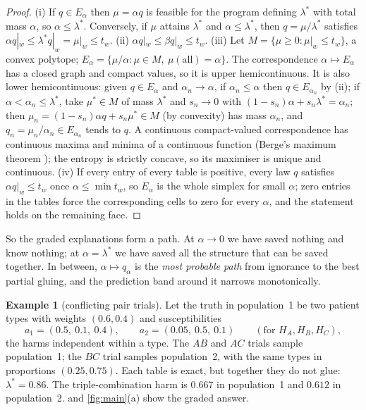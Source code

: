 \documentclass[11pt]{article}
\theoremstyle{definition}\newtheorem{definition}[theorem]{Definition}\newtheorem{remark}[theorem]{Remark}\newtheorem{example}[theorem]{Example}
\begin{document}
\begin{proof}
(i) If $q\in E_\alpha$ then $\mu=\alpha q$ is feasible for the program defining $\lambda^*$ with total mass $\alpha$, so $\alpha\le
\lambda^*$. Conversely, if $\mu$ attains $\lambda^*$ and $\alpha\le\lambda^*$, then $q=\mu/\lambda^*$ satisfies $\alpha q|_w\le
\lambda^* q|_w=\mu|_w\le t_w$. (ii) $\alpha q|_w\le\beta q|_w\le t_w$.
(iii) Let $M=\{\mu\ge0:\mu|_w\le t_w\}$, a convex polytope; $E_\alpha=\{\mu/\alpha:\mu\in M,\ \mu(\text{all})=\alpha\}$. The correspondence $\alpha\mapsto E_\alpha$ has a closed graph and compact values, so it is upper hemicontinuous. It is also lower hemicontinuous: given $q\in E_\alpha$ and $\alpha_n\to\alpha$, if $\alpha_n\le\alpha$ then $q\in E_{\alpha_n}$ by (ii); if $\alpha<\alpha_n\le\lambda^*$, take $\mu^*\in M$ of mass $\lambda^*$ and $s_n\to0$ with $(1-s_n)\alpha+s_n\lambda^*=\alpha_n$; then $\mu_n=(1-s_n)\alpha q+s_n\mu^*\in M$ (by convexity) has mass $\alpha_n$, and $q_n=\mu_n/\alpha_n\in E_{\alpha_n}$ tends to $q$. A continuous compact-valued correspondence has continuous maxima and minima of a
continuous function (Berge's maximum theorem \cite{Berge1963}); the entropy is strictly concave, so its maximiser is unique and
continuous. (iv) If every entry of every table is positive, every law $q$ satisfies $\alpha q|_w\le t_w$ once $\alpha\le\min t_w$, so $E_\alpha$ is the whole simplex for small $\alpha$; zero entries in the tables force the corresponding cells to zero for every $\alpha$, and the statement holds on the remaining face.
\end{proof}

So the graded explanations form a path. At $\alpha\to0$ we have saved nothing and know nothing; at $\alpha=\lambda^*$ we have saved all
the structure that can be saved together. In between, $\alpha\mapsto q_\alpha$ is the \emph{most probable path} from ignorance to the
best partial gluing, and the prediction band around it narrows monotonically.

\begin{example}[conflicting pair trials]\label{ex:conflict}
Let the truth in population~1 be two patient types with weights $(0.6,0.4)$ and susceptibilities
\[
  a_1=(0.5,\ 0.1,\ 0.4),\qquad a_2=(0.05,\ 0.5,\ 0.1)\qquad(\text{for }H_A,H_B,H_C),
\]
the harms independent within a type. The $AB$ and $AC$ trials sample population~1; the $BC$ trial samples population~2, with the same
types in proportions $(0.25,0.75)$. Each table is exact, but together they do not glue: $\lambda^*=0.86$. The triple-combination harm is
$0.667$ in population~1 and $0.612$ in population~2.  and \cref{fig:main}(a) show the graded answer.
\end{example}
\end{document}
